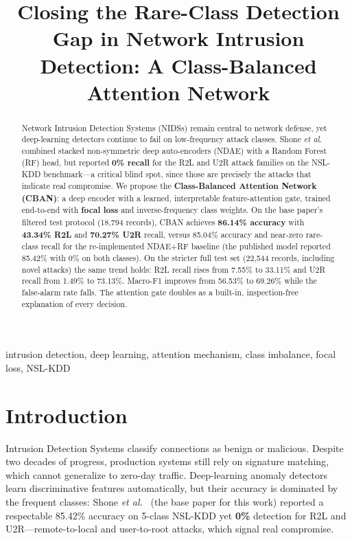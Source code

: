 \documentclass[conference]{IEEEtran}
\begin{document}
\title{Closing the Rare-Class Detection Gap in Network Intrusion Detection: A Class-Balanced Attention Network}

\author{
}

\maketitle

\begin{abstract}
Network Intrusion Detection Systems (NIDSs) remain central to network defense,
yet deep-learning detectors continue to fail on low-frequency attack classes.
Shone \textit{et al.}~\cite{shone2018} combined stacked non-symmetric deep
auto-encoders (NDAE) with a Random Forest (RF) head, but reported
\textbf{0\% recall} for the R2L and U2R attack families on the NSL-KDD
benchmark---a critical blind spot, since those are precisely the attacks that
indicate real compromise. We propose the \textbf{Class-Balanced Attention
Network (CBAN)}: a deep encoder with a learned, interpretable
feature-attention gate, trained end-to-end with \textbf{focal loss} and
inverse-frequency class weights. On the base paper's filtered test protocol
(18,794 records), CBAN achieves \textbf{86.14\% accuracy} with
\textbf{43.34\% R2L} and \textbf{70.27\% U2R} recall, versus
85.04\% accuracy and near-zero rare-class recall for the re-implemented
NDAE+RF baseline (the published model reported 85.42\% with 0\% on both
classes). On the stricter full test set (22,544 records, including novel
attacks) the same trend holds: R2L recall rises from 7.55\% to
33.11\% and U2R recall from 1.49\% to 73.13\%. Macro-F1
improves from 56.53\% to 69.26\% while the false-alarm rate
falls. The attention gate doubles as a built-in, inspection-free explanation of
every decision.
\end{abstract}

\begin{IEEEkeywords}
intrusion detection, deep learning, attention mechanism, class imbalance, focal loss, NSL-KDD
\end{IEEEkeywords}

\section{Introduction}
 Intrusion Detection Systems classify connections as
benign or malicious. Despite two decades of progress, production systems still
rely on signature matching, which cannot generalize to zero-day traffic.
Deep-learning anomaly detectors learn discriminative features automatically,
but their accuracy is dominated by the frequent classes: Shone
\textit{et al.}~\cite{shone2018} (the base paper for this work) reported a
respectable 85.42\% accuracy on 5-class NSL-KDD yet \textbf{0\%} detection for
R2L and U2R---remote-to-local and user-to-root attacks, which signal real
compromise.
\end{document}
